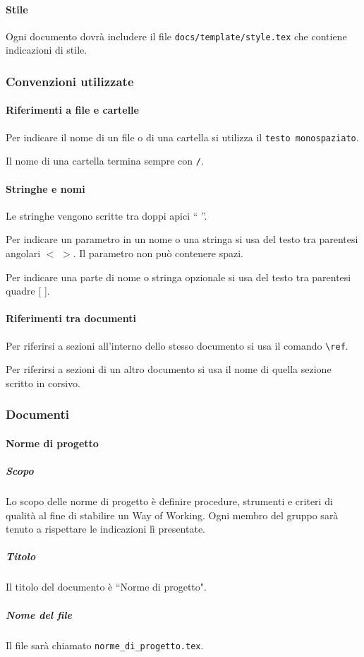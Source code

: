 \documentclass[a4paper, 12pt]{article}
\begin{document}
\paragraph{Stile}
Ogni documento dovrà includere il file \texttt{docs/template/style.tex} che contiene indicazioni di stile.



\subsubsection{Convenzioni utilizzate}
\paragraph{Riferimenti a file e cartelle}
Per indicare il nome di un file o di una cartella si utilizza il  \texttt{testo monospaziato}.

Il nome di una cartella termina sempre con \texttt{/}.

\paragraph{Stringhe e nomi}
Le stringhe vengono scritte tra doppi apici `` ''.

Per indicare un parametro in un nome o una stringa si usa del testo tra parentesi angolari $<$ $>$. Il parametro non può contenere spazi.

Per indicare una parte di nome o stringa opzionale si usa del testo tra parentesi quadre [ ].

\paragraph{Riferimenti tra documenti}
Per riferirsi a sezioni all'interno dello stesso documento si usa il comando \verb-\ref-.

Per riferirsi a sezioni di un altro documento si usa il nome di quella sezione scritto in corsivo.

\subsubsection{Documenti}\label{documentazione-documenti}

\paragraph{Norme di progetto}
\subparagraph{Scopo}
Lo scopo delle norme di progetto è definire procedure, strumenti e criteri di qualità al fine di stabilire un Way of Working. Ogni membro del gruppo sarà tenuto a rispettare le indicazioni lì presentate.
\subparagraph{Titolo}
Il titolo del documento è ``Norme di progetto".
\subparagraph{Nome del file}
Il file sarà chiamato \texttt{norme\_di\_progetto.tex}.
\end{document}
